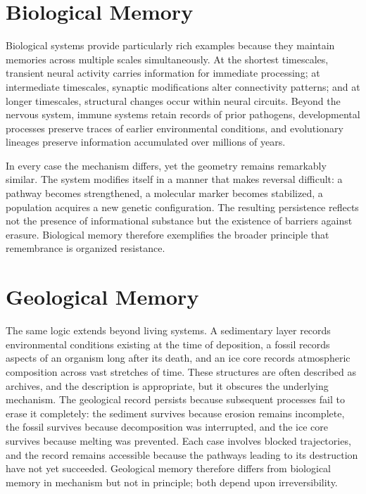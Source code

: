 \documentclass[11pt,oneside]{book}
\theoremstyle{plain}
\theoremstyle{definition}
\theoremstyle{remark}
\begin{document}
\section{Biological Memory}

Biological systems provide particularly rich examples because they maintain memories across multiple scales simultaneously. At the shortest timescales, transient neural activity carries information for immediate processing; at intermediate timescales, synaptic modifications alter connectivity patterns; and at longer timescales, structural changes occur within neural circuits. Beyond the nervous system, immune systems retain records of prior pathogens, developmental processes preserve traces of earlier environmental conditions, and evolutionary lineages preserve information accumulated over millions of years.

In every case the mechanism differs, yet the geometry remains remarkably similar. The system modifies itself in a manner that makes reversal difficult: a pathway becomes strengthened, a molecular marker becomes stabilized, a population acquires a new genetic configuration. The resulting persistence reflects not the presence of informational substance but the existence of barriers against erasure. Biological memory therefore exemplifies the broader principle that remembrance is organized resistance.

\section{Geological Memory}

The same logic extends beyond living systems. A sedimentary layer records environmental conditions existing at the time of deposition, a fossil records aspects of an organism long after its death, and an ice core records atmospheric composition across vast stretches of time. These structures are often described as archives, and the description is appropriate, but it obscures the underlying mechanism. The geological record persists because subsequent processes fail to erase it completely: the sediment survives because erosion remains incomplete, the fossil survives because decomposition was interrupted, and the ice core survives because melting was prevented. Each case involves blocked trajectories, and the record remains accessible because the pathways leading to its destruction have not yet succeeded. Geological memory therefore differs from biological memory in mechanism but not in principle; both depend upon irreversibility.
\end{document}
